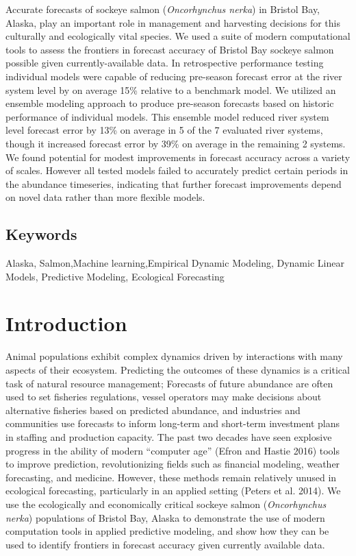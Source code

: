 \documentclass[
]{article}
\begin{document}
Accurate forecasts of sockeye salmon (\emph{Oncorhynchus nerka}) in Bristol Bay, Alaska, play an important role in management and harvesting decisions for this culturally and ecologically vital species. We used a suite of modern computational tools to assess the frontiers in forecast accuracy of Bristol Bay sockeye salmon possible given currently-available data. In retrospective performance testing individual models were capable of reducing pre-season forecast error at the river system level by on average 15\% relative to a benchmark model. We utilized an ensemble modeling approach to produce pre-season forecasts based on historic performance of individual models. This ensemble model reduced river system level forecast error by 13\% on average in 5 of the 7 evaluated river systems, though it increased forecast error by 39\% on average in the remaining 2 systems. We found potential for modest improvements in forecast accuracy across a variety of scales. However all tested models failed to accurately predict certain periods in the abundance timeseries, indicating that further forecast improvements depend on novel data rather than more flexible models.

\hypertarget{keywords}{%
\subsection*{Keywords}\label{keywords}}

Alaska, Salmon,Machine learning,Empirical Dynamic Modeling, Dynamic Linear Models, Predictive Modeling, Ecological Forecasting

\newpage

\hypertarget{introduction}{%
\section*{Introduction}\label{introduction}}

Animal populations exhibit complex dynamics driven by interactions with many aspects of their ecosystem. Predicting the outcomes of these dynamics is a critical task of natural resource management; Forecasts of future abundance are often used to set fisheries regulations, vessel operators may make decisions about alternative fisheries based on predicted abundance, and industries and communities use forecasts to inform long-term and short-term investment plans in staffing and production capacity. The past two decades have seen explosive progress in the ability of modern ``computer age'' (Efron and Hastie 2016) tools to improve prediction, revolutionizing fields such as financial modeling, weather forecasting, and medicine. However, these methods remain relatively unused in ecological forecasting, particularly in an applied setting (Peters et al. 2014). We use the ecologically and economically critical sockeye salmon (\emph{Oncorhynchus nerka}) populations of Bristol Bay, Alaska to demonstrate the use of modern computation tools in applied predictive modeling, and show how they can be used to identify frontiers in forecast accuracy given currently available data.
\end{document}
